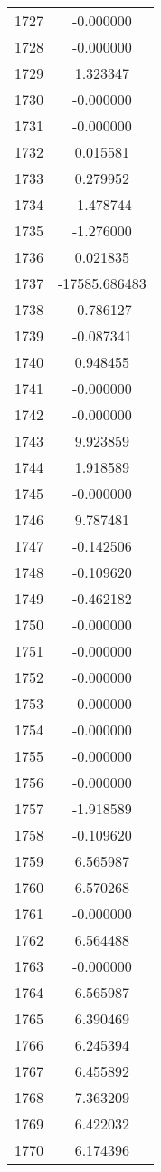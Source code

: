 \documentclass[12pt]{article}
\begin{document}
\begin{longtable}{@{}cc@{}}
1727 & -0.000000 \\
1728 & -0.000000 \\
1729 & 1.323347 \\
1730 & -0.000000 \\
1731 & -0.000000 \\
1732 & 0.015581 \\
1733 & 0.279952 \\
1734 & -1.478744 \\
1735 & -1.276000 \\
1736 & 0.021835 \\
1737 & -17585.686483 \\
1738 & -0.786127 \\
1739 & -0.087341 \\
1740 & 0.948455 \\
1741 & -0.000000 \\
1742 & -0.000000 \\
1743 & 9.923859 \\
1744 & 1.918589 \\
1745 & -0.000000 \\
1746 & 9.787481 \\
1747 & -0.142506 \\
1748 & -0.109620 \\
1749 & -0.462182 \\
1750 & -0.000000 \\
1751 & -0.000000 \\
1752 & -0.000000 \\
1753 & -0.000000 \\
1754 & -0.000000 \\
1755 & -0.000000 \\
1756 & -0.000000 \\
1757 & -1.918589 \\
1758 & -0.109620 \\
1759 & 6.565987 \\
1760 & 6.570268 \\
1761 & -0.000000 \\
1762 & 6.564488 \\
1763 & -0.000000 \\
1764 & 6.565987 \\
1765 & 6.390469 \\
1766 & 6.245394 \\
1767 & 6.455892 \\
1768 & 7.363209 \\
1769 & 6.422032 \\
1770 & 6.174396 \\

\end{longtable}
\end{document}

